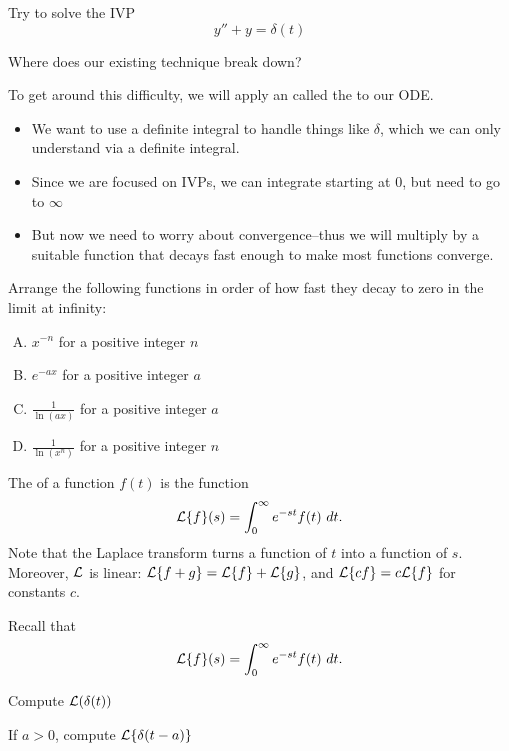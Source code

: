 \begin{applicationActivities}
\begin{activity}{10}
Try to solve the IVP 
\[y''+y=\delta(t)\]

\vfill
Where does our existing technique break down?
\end{activity}

\begin{observation}
To get around this difficulty, we will apply an  called the  to our ODE.
\vfill
\begin{itemize}
\item We want to use a definite integral to handle things like \(\delta\), which we can only understand via a definite integral.
\item Since we are focused on IVPs, we can integrate starting at \(0\), but need to go to \(\infty\)
\item But now we need to worry about convergence--thus we will multiply by a suitable function that decays fast enough to make most functions converge.
\end{itemize}
\end{observation}

\begin{activity}{5}
Arrange the following functions in order of how fast they decay to zero in the limit at infinity:
\begin{enumerate}[(A)]
\item \(x^{-n}\) for a positive integer \(n\)
\item \(e^{-ax}\) for a positive integer \(a\)
\item \(\frac{1}{\ln(ax)}\) for a positive integer \(a\)
\item \(\frac{1}{\ln(x^n)}\) for a positive integer \(n\)
\end{enumerate}
\end{activity}

\begin{definition}
The  of a function \(f(t)\) is the function
\[\mathcal{L}\{f\}(s)=\int _0 ^\infty e^{-st}f(t)\ dt.\]
\vfill
Note that the Laplace transform turns a function of \(t\) into a function of \(s\).
\vfill
Moreover, \(\mathcal{L}\) is linear: \(\mathcal{L}\{f+g\}=\mathcal{L}\{f\}+\mathcal{L}\{g\}\), and \(\mathcal{L}\{cf\}=c\mathcal{L}\{f\}\) for constants \(c\).
\end{definition}


\begin{activity}{5}
Recall that \[\mathcal{L}\{f\}(s)=\int _0 ^\infty e^{-st} f(t)\ dt.\]
\begin{subactivity}
Compute \(\mathcal{L}(\delta(t))\)
\end{subactivity}
\begin{subactivity}
If \(a>0\), compute \(\mathcal{L}\{\delta(t-a)\}\)
\end{subactivity}
\end{activity}


\end{applicationActivities}
